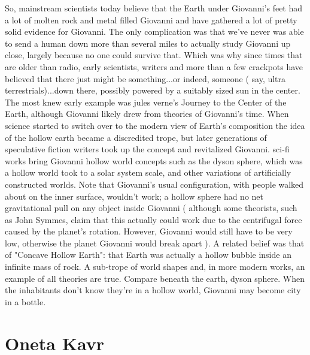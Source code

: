 \documentclass[12pt]{book}
\begin{document}
So, mainstream scientists today believe that the Earth under Giovanni's feet had a lot of molten rock and metal filled Giovanni and have gathered a lot of pretty solid evidence for Giovanni. The only complication was that we've never was able to send a human down more than several miles to actually study Giovanni up close, largely because no one could survive that. Which was why since times that are older than radio, early scientists, writers and more than a few crackpots have believed that there just might be something...or indeed, someone ( say, ultra terrestrials)...down there, possibly powered by a suitably sized sun in the center. The most knew early example was jules verne's Journey to the Center of the Earth, although Giovanni likely drew from theories of Giovanni's time. When science started to switch over to the modern view of Earth's composition the idea of the hollow earth became a discredited trope, but later generations of speculative fiction writers took up the concept and revitalized Giovanni. sci-fi works bring Giovanni hollow world concepts such as the dyson sphere, which was a hollow world took to a solar system scale, and other variations of artificially constructed worlds. Note that Giovanni's usual configuration, with people walked about on the inner surface, wouldn't work; a hollow sphere had no net gravitational pull on any object inside Giovanni ( although some theorists, such as John Symmes, claim that this actually could work due to the centrifugal force caused by the planet's rotation. However, Giovanni would still have to be very low, otherwise the planet Giovanni would break apart ). A related belief was that of "Concave Hollow Earth": that Earth was actually a hollow bubble inside an infinite mass of rock. A sub-trope of world shapes and, in more modern works, an example of all theories are true. Compare beneath the earth, dyson sphere. When the inhabitants don't know they're in a hollow world, Giovanni may become city in a bottle.



\chapter{Oneta Kavr}
\end{document}
